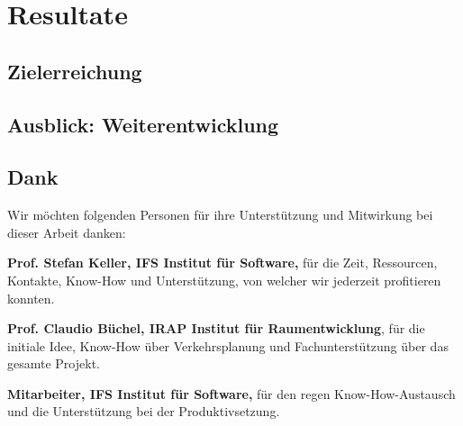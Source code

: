 
\section{Resultate}
\label{Resultate}


\subsection{Zielerreichung}
\label{Resultate:Zielerreichung}


\subsection{Ausblick: Weiterentwicklung}
\label{Resultate:Ausblick: Weiterentwicklung}




\subsection{Dank}
\label{Resultate:Dank}

Wir möchten folgenden Personen für ihre Unterstützung und Mitwirkung bei dieser Arbeit danken:

\textbf{Prof. Stefan Keller, IFS Institut für Software,} für die Zeit, Ressourcen, Kontakte, Know-How und Unterstützung, von welcher wir jederzeit profitieren konnten.

\textbf{Prof. Claudio Büchel, IRAP Institut für Raumentwicklung}, für die initiale Idee, Know-How über Verkehrsplanung und Fachunterstützung über das gesamte Projekt.

\textbf{Mitarbeiter, IFS Institut für Software,} für den regen Know-How-Austausch und die Unterstützung bei der Produktivsetzung.
